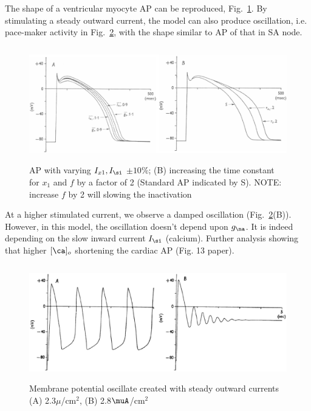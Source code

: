 The shape of a ventricular myocyte AP can be reproduced,
Fig.~\ref{fig:BL_cardiacAP}. By stimulating a steady outward current,
the model can also produce oscillation, i.e. pace-maker activity in
Fig.~\ref{fig:beeler_reuter_2}, with the shape similar to AP of that
in SA node.
\begin{figure}[hbt]
  \centerline{\includegraphics[height=5cm,
    angle=0]{./images/BL_cardiacAP.eps}}
  \caption{AP with varying $I_{x1},I_\si$ $\pm 10\%$; (B) increasing
    the time constant for $x_1$ and $f$ by a factor of 2 (Standard AP
    indicated by S). NOTE: increase $f$ by 2 will slowing the
    inactivation}
\label{fig:BL_cardiacAP}
\end{figure}
At a higher stimulated current, we observe a damped oscillation
(Fig.~\ref{fig:beeler_reuter_2}(B)). However, in this model, the
oscillation doesn't depend upon $g_\na$. It is indeed depending on
the slow inward current $I_\si$ (calcium). Further analysis showing
that higher $[\ca]_o$ shortening the cardiac AP (Fig. 13 paper).

\begin{figure}[!hbt]
  \centerline{    \includegraphics[height=5cm,
    angle=0]{./images/beeler_reuter_2.eps}}
    \caption{Membrane potential oscillate created with steady outward
      currents (A) 2.3$\mu$/cm$^2$, (B) 2.8$\muA$/cm$^2$}
    \label{fig:beeler_reuter_2}
\end{figure}

